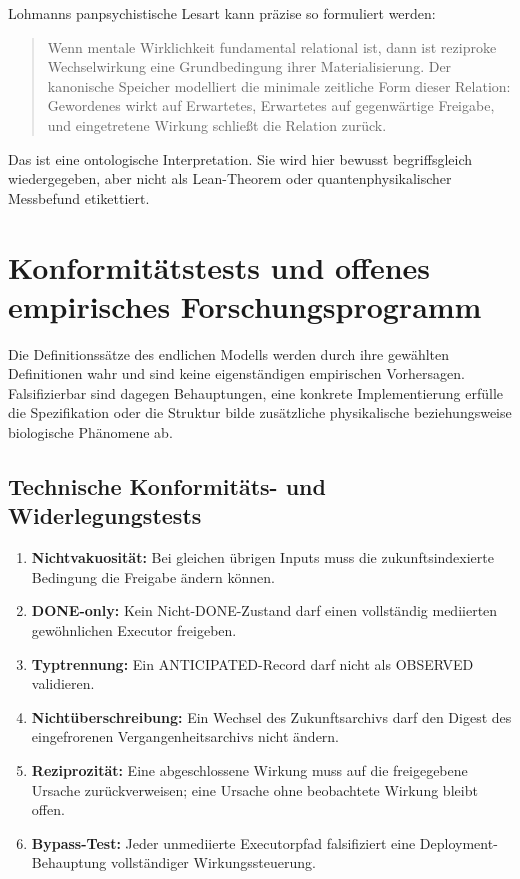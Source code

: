 \documentclass[11pt,a4paper]{article}
\theoremstyle{remark}
\begin{document}
Lohmanns panpsychistische Lesart kann präzise so formuliert werden:

\begin{quote}
Wenn mentale Wirklichkeit fundamental relational ist, dann ist reziproke
Wechselwirkung eine Grundbedingung ihrer Materialisierung. Der kanonische
Speicher modelliert die minimale zeitliche Form dieser Relation: Gewordenes
wirkt auf Erwartetes, Erwartetes auf gegenwärtige Freigabe, und eingetretene
Wirkung schließt die Relation zurück.
\end{quote}

Das ist eine ontologische Interpretation. Sie wird hier bewusst
begriffsgleich wiedergegeben, aber nicht als Lean-Theorem oder
quantenphysikalischer Messbefund etikettiert.

\section{Konformitätstests und offenes empirisches Forschungsprogramm}

Die Definitionssätze des endlichen Modells werden durch ihre gewählten
Definitionen wahr und sind keine eigenständigen empirischen Vorhersagen.
Falsifizierbar sind dagegen Behauptungen, eine konkrete Implementierung
erfülle die Spezifikation oder die Struktur bilde zusätzliche physikalische
beziehungsweise biologische Phänomene ab.

\subsection{Technische Konformitäts- und Widerlegungstests}

\begin{enumerate}
  \item \textbf{Nichtvakuosität:} Bei gleichen übrigen Inputs muss die
  zukunftsindexierte Bedingung die Freigabe ändern können.
  \item \textbf{DONE-only:} Kein Nicht-DONE-Zustand darf einen vollständig
  mediierten gewöhnlichen Executor freigeben.
  \item \textbf{Typtrennung:} Ein \textsf{ANTICIPATED}-Record darf nicht als
  \textsf{OBSERVED} validieren.
  \item \textbf{Nichtüberschreibung:} Ein Wechsel des Zukunftsarchivs darf
  den Digest des eingefrorenen Vergangenheitsarchivs nicht ändern.
  \item \textbf{Reziprozität:} Eine abgeschlossene Wirkung muss auf die
  freigegebene Ursache zurückverweisen; eine Ursache ohne beobachtete Wirkung
  bleibt offen.
  \item \textbf{Bypass-Test:} Jeder unmediierte Executorpfad falsifiziert
  eine Deployment-Behauptung vollständiger Wirkungssteuerung.
\end{enumerate}
\end{document}
